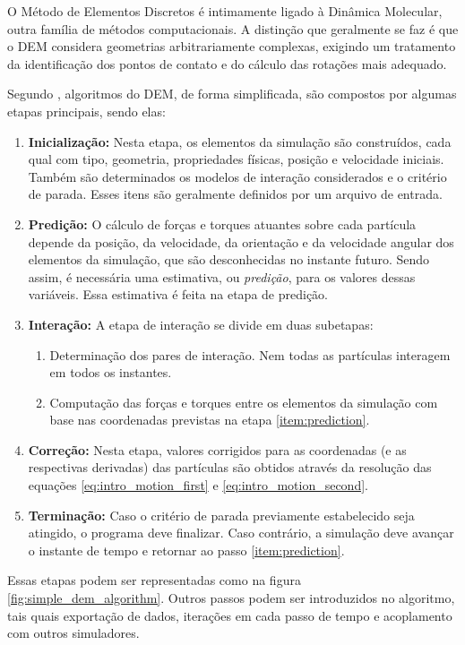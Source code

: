 O Método de Elementos Discretos é intimamente ligado à Dinâmica Molecular, outra família de métodos computacionais. A distinção que geralmente se faz é que o DEM considera geometrias arbitrariamente complexas, exigindo um tratamento da identificação dos pontos de contato e do cálculo das rotações mais adequado.

Segundo , algoritmos do DEM, de forma simplificada, são compostos por algumas etapas principais, sendo elas:
\begin{enumerate}
	\item \textbf{Inicialização:} Nesta etapa, os elementos da simulação são construídos, cada qual com tipo, geometria, propriedades físicas, posição e velocidade iniciais. Também são determinados os modelos de interação considerados e o critério de parada. Esses itens são geralmente definidos por um arquivo de entrada.
	\item \textbf{Predição:} O cálculo de forças e torques atuantes sobre cada partícula depende da posição, da velocidade, da orientação e da velocidade angular dos elementos da simulação, que são desconhecidas no instante futuro. Sendo assim, é necessária uma estimativa, ou \textit{predição}, para os valores dessas variáveis. Essa estimativa é feita na etapa de predição. \label{item:prediction}
	\item \textbf{Interação:} A etapa de interação se divide em duas subetapas:
		\begin{enumerate}
			\item Determinação dos pares de interação. Nem todas as partículas interagem em todos os instantes.
			\item Computação das forças e torques entre os elementos da simulação com base nas coordenadas previstas na etapa \ref{item:prediction}.
		\end{enumerate}
	\item \textbf{Correção:} Nesta etapa, valores corrigidos para as coordenadas (e as respectivas derivadas) das partículas são obtidos através da resolução das equações \eqref{eq:intro_motion_first} e \eqref{eq:intro_motion_second}.
	\item \textbf{Terminação:} Caso o critério de parada previamente estabelecido seja atingido, o programa deve finalizar. Caso contrário, a simulação deve avançar o instante de tempo e retornar ao passo \ref{item:prediction}.
\end{enumerate}

Essas etapas podem ser representadas como na figura \ref{fig:simple_dem_algorithm}. Outros passos podem ser introduzidos no algoritmo, tais quais exportação de dados, iterações em cada passo de tempo e acoplamento com outros simuladores.

